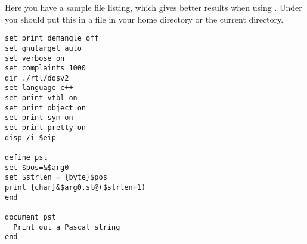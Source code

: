 Here you have a sample  file listing, which gives better
results when using . Under \linux you should put this in a
 file in your home directory or the current directory.

\begin{verbatim}
set print demangle off
set gnutarget auto
set verbose on
set complaints 1000
dir ./rtl/dosv2
set language c++
set print vtbl on
set print object on
set print sym on
set print pretty on
disp /i $eip

define pst
set $pos=&$arg0
set $strlen = {byte}$pos
print {char}&$arg0.st@($strlen+1)
end

document pst
  Print out a Pascal string
end
\end{verbatim}




